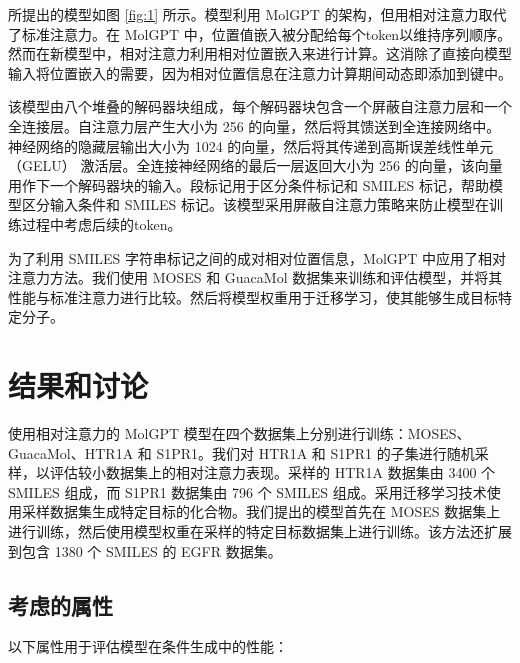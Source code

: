 \begin{translation}
所提出的模型如图 \ref{fig:1} 所示。模型利用 MolGPT 的架构，但用相对注意力取代了标准注意力。在 MolGPT 中，位置值嵌入被分配给每个token以维持序列顺序。然而在新模型中，相对注意力利用相对位置嵌入来进行计算。这消除了直接向模型输入将位置嵌入的需要，因为相对位置信息在注意力计算期间动态即添加到键中。

该模型由八个堆叠的解码器块组成，每个解码器块包含一个屏蔽自注意力层和一个全连接层。自注意力层产生大小为 256 的向量，然后将其馈送到全连接网络中。神经网络的隐藏层输出大小为 1024 的向量，然后将其传递到高斯误差线性单元 （GELU） 激活层。全连接神经网络的最后一层返回大小为 256 的向量，该向量用作下一个解码器块的输入。段标记用于区分条件标记和 SMILES 标记，帮助模型区分输入条件和 SMILES 标记。该模型采用屏蔽自注意力策略来防止模型在训练过程中考虑后续的token。

为了利用 SMILES 字符串标记之间的成对相对位置信息，MolGPT 中应用了相对注意力方法。我们使用 MOSES 和 GuacaMol 数据集来训练和评估模型，并将其性能与标准注意力进行比较。然后将模型权重用于迁移学习，使其能够生成目标特定分子。

\section{结果和讨论}

使用相对注意力的 MolGPT 模型在四个数据集上分别进行训练：MOSES、GuacaMol、HTR1A 和 S1PR1。我们对 HTR1A 和 S1PR1 的子集进行随机采样，以评估较小数据集上的相对注意力表现。采样的 HTR1A 数据集由 3400 个 SMILES 组成，而 S1PR1 数据集由 796 个 SMILES 组成。采用迁移学习技术使用采样数据集生成特定目标的化合物。我们提出的模型首先在 MOSES 数据集上进行训练，然后使用模型权重在采样的特定目标数据集上进行训练。该方法还扩展到包含 1380 个 SMILES 的 EGFR 数据集。

\subsection{考虑的属性}

以下属性用于评估模型在条件生成中的性能：


\end{translation}
